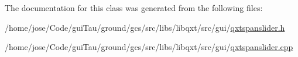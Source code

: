 The documentation for this class was generated from the following files\-:\begin{DoxyCompactItemize}
\item 
/home/jose/\-Code/gui\-Tau/ground/gcs/src/libs/libqxt/src/gui/\hyperlink{qxtspanslider_8h}{qxtspanslider.\-h}\item 
/home/jose/\-Code/gui\-Tau/ground/gcs/src/libs/libqxt/src/gui/\hyperlink{qxtspanslider_8cpp}{qxtspanslider.\-cpp}\end{DoxyCompactItemize}
